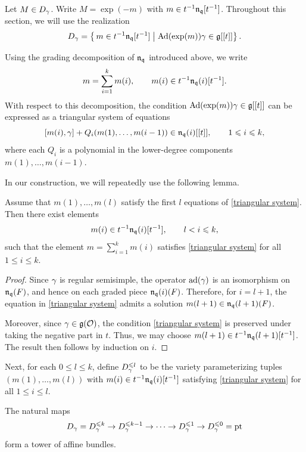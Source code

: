 \documentclass[11pt]{article}
\numberwithin{equation}{section}
\begin{document}
Let $M\in D_\gamma$. Write $M=\exp(-m)$ with
$m\in t^{-1}\mathfrak{n}_{\mathfrak{q}}[t^{-1}]$.
Throughout this section, we will use the realization
\[
D_\gamma=\left\{\, m\in t^{-1}\mathfrak{n}_{\mathfrak{q}}[t^{-1}]
\;\middle|\;
\operatorname{Ad}(\exp(m))\gamma \in \mathfrak{g}[[t]]
\right\}.
\]

Using the grading decomposition of $\mathfrak{n}_{\mathfrak{q}}$ introduced above, we write
\[
m=\sum_{i=1}^{k} m(i),
\qquad
m(i)\in t^{-1}\mathfrak{n}_{\mathfrak{q}}(i)[t^{-1}].
\]
With respect to this decomposition, the condition
$\operatorname{Ad}(\exp(m))\gamma \in \mathfrak{g}[[t]]$ can be expressed as a triangular system
of equations
\begin{equation}\label{triangular system}
[m(i),\gamma] + Q_i(m(1),\dots,m(i-1)) \in \mathfrak{n}_{\mathfrak{q}}(i)[[t]],
\qquad 1\leqslant i\leqslant k,
\end{equation}
where each $Q_i$ is a polynomial in the lower-degree components
$m(1),\dots,m(i-1)$.

In our construction, we will repeatedly use the following lemma.

\begin{lem}\label{successive lifting}
Assume that $m(1),\dots, m(l)$ satisfy the first $l$ equations of
\eqref{triangular system}. Then there exist elements
\[
m(i)\in t^{-1}\mathfrak{n}_{\mathfrak{q}}(i)[t^{-1}], \qquad l < i \leqslant k,
\]
such that the element $m=\sum_{i=1}^{k} m(i)$ satisfies
\eqref{triangular system} for all $1\leqslant i\leqslant k$.
\end{lem}

\begin{proof}
Since $\gamma$ is regular semisimple, the operator $\operatorname{ad}(\gamma)$ is an
isomorphism on $\mathfrak{n}_{\mathfrak{q}}(F)$, and hence on each graded piece
$\mathfrak{n}_{\mathfrak{q}}(i)(F)$. Therefore, for $i=l+1$, the equation in
\eqref{triangular system} admits a solution
$m(l+1)\in \mathfrak{n}_{\mathfrak{q}}(l+1)(F)$.

Moreover, since $\gamma\in \mathfrak{g}(\mathcal{O})$, the condition
\eqref{triangular system} is preserved under taking the negative
part in $t$. Thus, we may choose $m(l+1)\in t^{-1}\mathfrak{n}_{\mathfrak{q}}(l+1)[t^{-1}]$.
The result then follows by induction on $i$.
\end{proof}
Next, for each $0\leqslant l\leqslant k$, define $D_\gamma^{\leqslant l}$ to be the variety
parameterizing tuples $(m(1),\dots,m(l))$ with
$m(i)\in t^{-1}\mathfrak{n}_{\mathfrak{q}}(i)[t^{-1}]$ satisfying \eqref{triangular system}
for all $1\leqslant i\leqslant l$.

\begin{pro}
The natural maps
\[
D_\gamma = D_\gamma^{\leqslant k} \to D_\gamma^{\leqslant k-1} \to \cdots \to
D_\gamma^{\leqslant 1} \to D_\gamma^{\leqslant 0} = \operatorname{pt}
\]
form a tower of affine bundles.
\end{pro}
\end{document}
